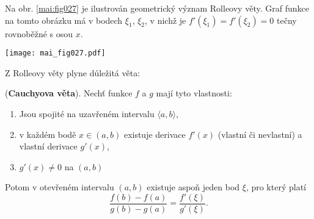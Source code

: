       \begin{tcnote}
        Na obr. \ref{mai:fig027} je ilustrován geometrický význam Rolleovy věty. Graf funkce na 
        tomto obrázku má v bodech $\xi_1$, $\xi_2$, v nichž je $f'(\xi_1)=f'(\xi_2)=0$ tečny 
        rovnoběžné s osou \(x\). 
        {\centering
        \captionsetup{type=figure}
        \texttt{[image: mai\_fig027.pdf]}
        \par}
      \end{tcnote}
      
      Z Rolleovy věty plyne důležitá věta:
      
      \begin{lemma}\label{MA1:lem_diff04}
        (\textbf{Cauchyova věta}). Nechť funkce $f$ a $g$ mají tyto vlastnosti:
        \begin{enumerate}[noitemsep]
          \item  Jsou spojité na uzavřeném intervalu $\langle a,b\rangle$,
          \item  v každém bodě $x\in(a,b)$ existuje derivace $f'(x)$ (vlastní či nevlastní) a 
                 vlastní derivace $g'(x)$,
          \item  $g'(x)\neq0$ na $(a,b)$
        \end{enumerate}
        Potom v otevřeném intervalu $(a,b)$ existuje aspoň jeden bod $\xi$, pro který platí
        \begin{equation}\label{MA1:eq_diff03}
          \frac{f(b)-f(a)}{g(b)-g(a)} = \frac{f'(\xi)}{g'(\xi)}.
        \end{equation} 
      \end{lemma} 
      
